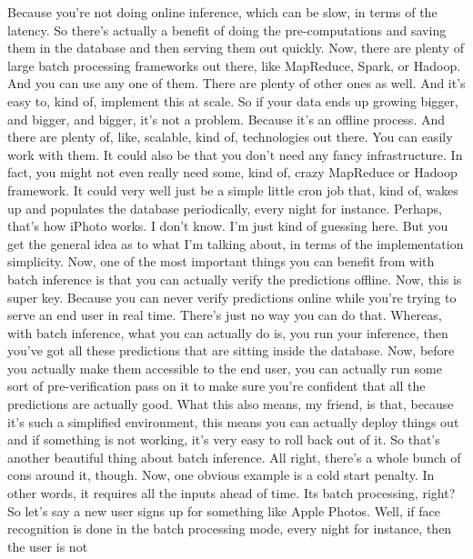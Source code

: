 {{{{{{{    Because you're not doing online inference,
    which can be slow, in terms of the latency.
    So there's actually a benefit of doing the pre-computations
    and saving them in the database and then serving them out quickly.
    Now, there are plenty of large batch processing frameworks
    out there, like MapReduce, Spark, or Hadoop.
    And you can use any one of them.
    There are plenty of other ones as well.
    And it's easy to, kind of, implement this at scale.
    So if your data ends up growing bigger, and bigger, and bigger,
    it's not a problem.
    Because it's an offline process.
    And there are plenty of, like, scalable, kind of, technologies out there.
    You can easily work with them.
    It could also be that you don't need any fancy infrastructure.
    In fact, you might not even really need some, kind of,
    crazy MapReduce or Hadoop framework.
    It could very well just be a simple little cron
    job that, kind of, wakes up and populates the database periodically,
    every night for instance.
    Perhaps, that's how iPhoto works.
    I don't know.
    I'm just kind of guessing here.
    But you get the general idea as to what I'm talking about,
    in terms of the implementation simplicity.
    Now, one of the most important things you
    can benefit from with batch inference is that you can actually
    verify the predictions offline.
    Now, this is super key.
    Because you can never verify predictions online while
    you're trying to serve an end user in real time.
    There's just no way you can do that.
    Whereas, with batch inference, what you can actually do
    is, you run your inference, then you've got all these predictions
    that are sitting inside the database.
    Now, before you actually make them accessible to the end user,
    you can actually run some sort of pre-verification pass
    on it to make sure you're confident that all the predictions are actually good.
    What this also means, my friend, is that, because it's
    such a simplified environment, this means you can actually deploy things
    out and if something is not working, it's very easy to roll back out of it.
    So that's another beautiful thing about batch inference.
    All right, there's a whole bunch of cons around it, though.
    Now, one obvious example is a cold start penalty.
    In other words, it requires all the inputs ahead of time.
    Its batch processing, right?
    So let's say a new user signs up for something like Apple Photos.
    Well, if face recognition is done in the batch processing mode,
    every night for instance, then the user is not
}}}}}}}
